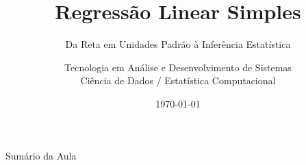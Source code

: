 \documentclass[10pt]{beamer}
\title[ADS - Aula 14]{Regressão Linear Simples}
\subtitle{Da Reta em Unidades Padrão à Inferência Estatística}
\author[ADS - IFCE]{Tecnologia em Análise e Desenvolvimento de Sistemas\texorpdfstring{\\ \small{Ciência de Dados / Estatística Computacional}}{}}
\institute[IFCE]{Instituto Federal do Ceará -- Campus Tauá}
\date{\today}
\begin{document}
\begin{frame}
    \titlepage
\end{frame}

\begin{frame}{Sumário da Aula}
    \tableofcontents
\end{frame}



\end{document}
